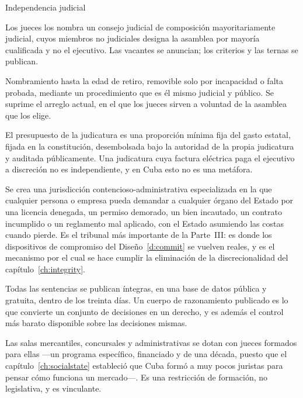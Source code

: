 \begin{design}{Independencia judicial}
\label{d:courts}
\begin{rules}
 Los jueces los nombra un consejo judicial de composición
mayoritariamente judicial, cuyos miembros no judiciales designa la asamblea por
mayoría cualificada y no el ejecutivo. Las vacantes se anuncian; los criterios y las
ternas se publican.

 Nombramiento hasta la edad de retiro, removible solo por
incapacidad o falta probada, mediante un procedimiento que es él mismo judicial y
público. Se suprime el arreglo actual, en el que los jueces sirven a voluntad de la
asamblea que los elige.

 El presupuesto de la judicatura es una proporción mínima fija
del gasto estatal, fijada en la constitución, desembolsada bajo la autoridad de la
propia judicatura y auditada públicamente. Una judicatura cuya factura eléctrica
paga el ejecutivo a discreción no es independiente, y en Cuba esto no es una
metáfora.

 Se crea una jurisdicción contencioso-administrativa
especializada en la que cualquier persona o empresa pueda demandar a cualquier
órgano del Estado por una licencia denegada, un permiso demorado, un bien incautado,
un contrato incumplido o un reglamento mal aplicado, con el Estado asumiendo las
costas cuando pierde. Es el tribunal más importante de la Parte~III: es donde los
dispositivos de compromiso del Diseño~\ref{d:commit} se vuelven reales, y es el
mecanismo por el cual se hace cumplir la eliminación de la discrecionalidad del
capítulo~\ref{ch:integrity}.

 Todas las sentencias se publican íntegras, en una base de datos
pública y gratuita, dentro de los treinta días. Un cuerpo de razonamiento publicado
es lo que convierte un conjunto de decisiones en un derecho, y es además el control
más barato disponible sobre las decisiones mismas.

 Las salas mercantiles, concursales y administrativas se
dotan con jueces formados para ellas ---un programa específico, financiado y de una
década, puesto que el capítulo~\ref{ch:socialstate} estableció que Cuba formó a muy
pocos juristas para pensar cómo funciona un mercado---. Es una restricción de
formación, no legislativa, y es vinculante.
\end{rules}
\end{design}


